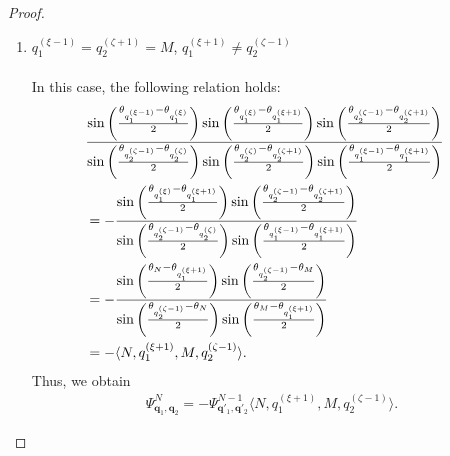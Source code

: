 \documentclass[
amsmath,amssymb,
]{revtex4-2}
\begin{document}
\begin{proof}
\begin{enumerate}
\item[\textit{Case.4:}] ${q_1^{(\xi-1)}} = {q_2^{(\zeta+1)}} = M$, ${q_1^{(\xi+1)}} \ne {q_2^{(\zeta-1)}}$\\ \\
In this case, the following relation holds:
\begin{align}
    &\frac{\sin\left( \frac{\theta_{q_1^{(\xi-1)}} - \theta_{q_1^{(\xi)}}}{2} \right)\sin\left( \frac{\theta_{q_1^{(\xi)}} - \theta_{q_1^{(\xi+1)}}}{2} \right)\sin\left( \frac{\theta_{q_2^{(\zeta-1)}} - \theta_{q_2^{(\zeta+1)}}}{2} \right)}
   {\sin\left( \frac{\theta_{q_2^{(\zeta-1)}} - \theta_{q_2^{(\zeta)}}}{2} \right)\sin\left( \frac{\theta_{q_2^{(\zeta)}} - \theta_{q_2^{(\zeta+1)}}}{2} \right)\sin\left( \frac{\theta_{q_1^{(\xi-1)}} - \theta_{q_1^{(\xi+1)}}}{2} \right)}\cr
    &=-\frac{\sin\left( \frac{\theta_{q_1^{(\xi)}} - \theta_{q_1^{(\xi+1)}}}{2} \right)\sin\left( \frac{\theta_{q_2^{(\zeta-1)}} - \theta_{q_2^{(\zeta+1)}}}{2} \right)}
   {\sin\left( \frac{\theta_{q_2^{(\zeta-1)}} - \theta_{q_2^{(\zeta)}}}{2} \right)\sin\left( \frac{\theta_{q_1^{(\xi-1)}} - \theta_{q_1^{(\xi+1)}}}{2} \right)}\cr
    &=-\frac{\sin\left( \frac{\theta_{N} - \theta_{q_1^{(\xi+1)}}}{2} \right)\sin\left( \frac{\theta_{q_2^{(\zeta-1)}} - \theta_{M}}{2} \right)}
   {\sin\left( \frac{\theta_{q_2^{(\zeta-1)}} - \theta_{N}}{2} \right)\sin\left( \frac{\theta_{M} - \theta_{q_1^{(\xi+1)}}}{2} \right)}\cr
    &= -\langle N,q_1^{(\xi+1)},M, q_2^{(\zeta-1)}\rangle.
\end{align}
Thus, we obtain
\begin{align}
    \Psi^N_{\bm{q}_1, \bm{q}_2} = -\Psi^{N-1}_{\bm{q}'_1, \bm{q}'_2}\langle N,q_1^{(\xi+1)},M, q_2^{(\zeta-1)}\rangle.
\end{align}


\end{enumerate}
\end{proof}
\end{document}
